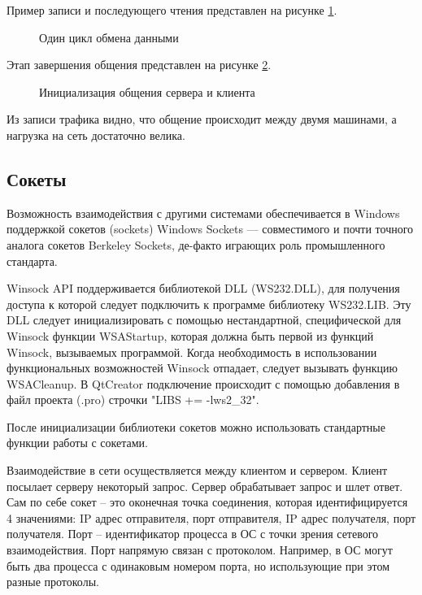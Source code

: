 \documentclass[a4paper]{article}
\begin{document}
	Пример записи и последующего чтения представлен на рисунке \ref{img:wiremsg}.
	\begin{figure}[h!]
		\caption{Один цикл обмена данными}
		\label{img:wiremsg}
	\end{figure}
	
	Этап завершения общения представлен на рисунке \ref{img:wireexit}.
	\begin{figure}[h!]
		\caption{Инициализация общения сервера и клиента}
		\label{img:wireexit}
	\end{figure}
	
	Из записи трафика видно, что общение происходит между двумя машинами, а нагрузка на сеть достаточно велика.
\subsection{Сокеты}
	Возможность взаимодействия с другими системами обеспечивается в Windows поддержкой сокетов (sockets) Windows Sockets — совместимого и почти точного аналога сокетов Berkeley Sockets, де-факто играющих роль промышленного стандарта.
	
	Winsock API поддерживается библиотекой DLL (WS232.DLL), для получения доступа к которой следует подключить к программе библиотеку WS232.LIB. Эту DLL следует инициализировать с помощью нестандартной, специфической для Winsock функции WSAStartup, которая должна быть первой из функций Winsock, вызываемых программой. Когда необходимость в использовании функциональных возможностей Winsock отпадает, следует вызывать функцию WSACleanup. В QtCreator подключение происходит с помощью добавления в файл проекта (.pro) строчки "LIBS += -lws2\_32".
	
	После инициализации библиотеки сокетов можно использовать стандартные функции работы с сокетами.
	
	Взаимодействие в сети осуществляется между клиентом и сервером. Клиент посылает серверу некоторый запрос. Сервер обрабатывает запрос и шлет ответ. Сам по себе сокет – это оконечная точка соединения, которая идентифицируется 4 значениями: IP адрес отправителя, порт отправителя, IP адрес получателя, порт получателя. Порт – идентификатор процесса в ОС с точки зрения сетевого взаимодействия. Порт напрямую связан с протоколом. Например, в ОС могут быть два процесса с одинаковым номером порта, но использующие при этом разные протоколы.
	
\end{document}
